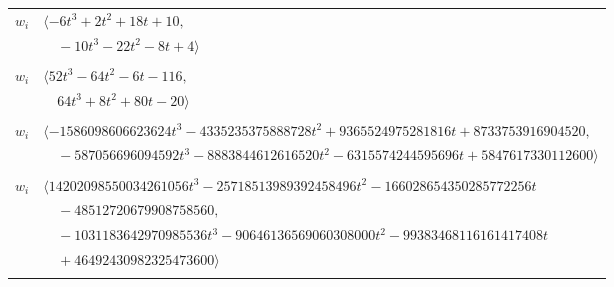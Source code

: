 \documentclass[11pt]{article}
\begin{document}
\begin{longtable}{@{}ll@{}}
$w_i$ & $\langle -6t^{3}+2t^{2}+18t+10,$\\
 & $\quad -10t^{3}-22t^{2}-8t+4\rangle$\\
\addlinespace[2pt]
\multicolumn{2}{@{}p{0.97\textwidth}@{}}{$i=29$, $D_i=1$, $\rho_{ij}$: $1{:}1, \allowbreak 3{:}2, \allowbreak 8{:}1, \allowbreak 19{:}2, \allowbreak 34{:}1, \allowbreak 36{:}1, \allowbreak 37{:}2, \allowbreak 48{:}1, \allowbreak 49{:}2, \allowbreak 56{:}1, \allowbreak 59{:}2, \allowbreak 61{:}2, \allowbreak 63{:}2$}\\
$w_i$ & $\langle 52t^{3}-64t^{2}-6t-116,$\\
 & $\quad 64t^{3}+8t^{2}+80t-20\rangle$\\
\addlinespace[2pt]
\multicolumn{2}{@{}p{0.97\textwidth}@{}}{$i=30$, $D_i=14348907$, $e_i=1$, $\rho_{ij}$: $1{:}1, \allowbreak 4{:}1, \allowbreak 7{:}1, \allowbreak 10{:}2, \allowbreak 18{:}2, \allowbreak 19{:}2, \allowbreak 20{:}2, \allowbreak 39{:}1, \allowbreak 40{:}2, \allowbreak 41{:}1, \allowbreak 43{:}1, \allowbreak 53{:}1, \allowbreak 55{:}2, \allowbreak 56{:}1, \allowbreak 61{:}1, \allowbreak 69{:}1, \allowbreak 71{:}1, \allowbreak 76{:}1, \allowbreak 85{:}2, \allowbreak 87{:}1, \allowbreak 89{:}2$}\\
$w_i$ & $\langle -1586098606623624t^{3}-4335235375888728t^{2}+9365524975281816t+8733753916904520,$\\
 & $\quad -587056696094592t^{3}-8883844612616520t^{2}-6315574244595696t+5847617330112600\rangle$\\
\addlinespace[2pt]
\multicolumn{2}{@{}p{0.97\textwidth}@{}}{$i=31$, $D_i=1162261467$, $e_i=2$, $\rho_{ij}$: $1{:}2, \allowbreak 4{:}2, \allowbreak 10{:}2, \allowbreak 13{:}2, \allowbreak 18{:}1, \allowbreak 19{:}1, \allowbreak 22{:}2, \allowbreak 39{:}1, \allowbreak 40{:}2, \allowbreak 42{:}2, \allowbreak 43{:}1, \allowbreak 45{:}2, \allowbreak 47{:}1, \allowbreak 52{:}2, \allowbreak 55{:}1, \allowbreak 56{:}2, \allowbreak 60{:}2, \allowbreak 66{:}2, \allowbreak 69{:}1, \allowbreak 74{:}1, \allowbreak 85{:}2$}\\
$w_i$ & $\langle 14202098550034261056t^{3}-25718513989392458496t^{2}-166028654350285772256t$\\
 & $\quad -48512720679908758560,$\\
 & $\quad -1031183642970985536t^{3}-90646136569060308000t^{2}-99383468116161417408t$\\
 & $\quad +46492430982325473600\rangle$\\
\addlinespace[2pt]
\multicolumn{2}{@{}p{0.97\textwidth}@{}}{$i=32$, $D_i=1$, $\rho_{ij}$: $0{:}2, \allowbreak 8{:}2, \allowbreak 11{:}1, \allowbreak 12{:}2, \allowbreak 20{:}1, \allowbreak 22{:}1, \allowbreak 26{:}2, \allowbreak 35{:}1, \allowbreak 46{:}2, \allowbreak 51{:}2, \allowbreak 60{:}1, \allowbreak 61{:}2, \allowbreak 62{:}1, \allowbreak 63{:}2$}\\

\end{longtable}
\end{document}
